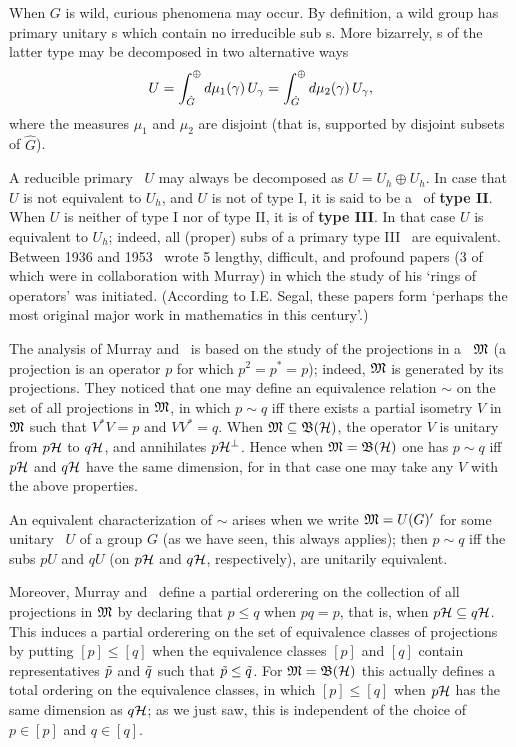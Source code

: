 When $G$ is wild, curious phenomena may occur.  By definition, a wild
group has primary unitary \rep s which contain no irreducible sub\rep
s. More bizarrely, \rep s of the latter type may be decomposed in two
alternative ways
$$
U=\int_{\hat{G}}^{\oplus}d\mu_1(\gamma)\, U_{\gamma}=
\int_{\hat{G}}^{\oplus}d\mu_2(\gamma)\, U_{\gamma},
$$
where the measures $\mu_1$ and $\mu_2$ are disjoint (that is,
supported by disjoint subsets of $\hat{G}$).

A reducible primary \rep\ $U$ may always be decomposed as $U=U_h\oplus
U_h$.  In case that $U$ is not equivalent to $U_h$, and $U$ is not of
type I, it is said to be a \rep\ of {\bf type II}. When $U$ is neither
of type I nor of type II, it is of {\bf type III}. In that case $U$ is
equivalent to $U_h$; indeed, all (proper) sub\rep s of a primary type
III \rep\ are equivalent.   Between
1936 and 1953 \vN\ wrote 5 lengthy, difficult, and profound papers (3
of which were in collaboration with Murray) in which the study of his
`rings of operators' was initiated. (According to I.E. Segal, these
papers form `perhaps the most original major work in mathematics in
this century'.)

The analysis of Murray and \vN\ is based on the study of the
projections in a \vNa\ ${\frak M}$ (a projection is an operator $p$ for which
$p^2=p^*=p$); indeed, ${\frak M}$ is generated by its projections. They
noticed that one may define an equivalence relation $\sim$ on the set
of all projections in ${\frak M}$, in which $p\sim q$ iff there exists a
partial isometry $V$ in ${\frak M}$ such that $V^*V=p$ and $VV^*=q$.  When
${\frak M}\subseteq {\frak B}({\cal H})$, the operator $V$ is unitary from $p{\cal H}$ to $q{\cal H}$,
and annihilates $p{\cal H}^{\perp}$. Hence when ${\frak M}={\frak B}({\cal H})$ one has $p\sim q$
iff $p{\cal H}$ and $q{\cal H}$ have the same dimension, for in that case one may
take any $V$ with the above properties.

An equivalent characterization of $\sim$ arises when we write
${\frak M}=U(G)'$ for some unitary \rep\ $U$ of a group $G$ (as we have seen,
this always applies); then $p\sim q$ iff the sub\rep s $pU$ and $qU$
(on $p{\cal H}$ and $q{\cal H}$, respectively), are unitarily equivalent.

Moreover, Murray and \vN\ define a partial orderering on the
collection of all projections in ${\frak M}$ by declaring that $p\leq q$ when
$pq=p$, that is, when $p{\cal H}\subseteq q{\cal H}$.  This induces a partial
orderering on the set of equivalence classes of projections by putting
$[p]\leq [q]$ when the equivalence classes $[p]$ and $[q]$ contain
representatives $\tilde{p}$ and $\tilde{q}$ such that $\tilde{p}\leq
\tilde{q}$.  For ${\frak M}={\frak B}({\cal H})$ this actually defines a total ordering on the
equivalence classes, in which $[p]\leq [q]$ when $p{\cal H}$ has the same
dimension as $q{\cal H}$; as we just saw, this is independent of the choice
of $p\in[p]$ and $q\in[q]$.

